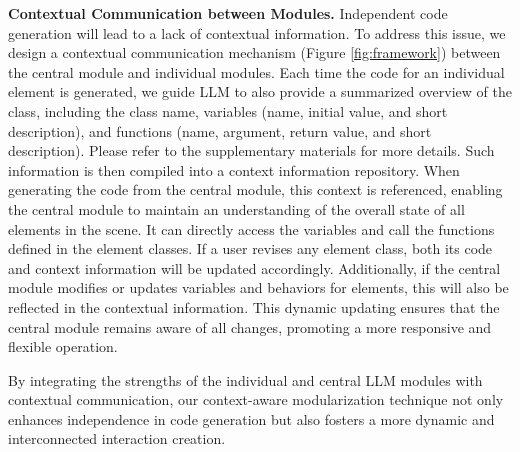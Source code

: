 \textbf{Contextual Communication between Modules.}
Independent code generation will lead to a lack of contextual information. To address this issue, %
we design a contextual communication mechanism  (Figure \ref{fig:framework}) between the central module and individual modules. Each time {the} code for {an} individual element is generated, we guide LLM to also provide a summarized overview of the class, including the class name, variables (name, initial value, and short description), and functions (name, argument, return value, and short description). {Please refer to the supplementary materials for more details.} Such information is then compiled into a context information repository. When generating the code from the central module, this {context} %
is referenced, enabling the central module to maintain an understanding of the overall state of all elements in the scene. It can directly access the variables 
and call the functions defined in the element classes. If a user revises any element {class}, %
both {its} %
code and context information will be updated accordingly. Additionally, if the central module modifies or updates variables and behaviors for elements, this will also be reflected in the contextual information. This dynamic updating ensures that the central module remains aware of all changes, promoting a more responsive and flexible operation.

By integrating the strengths of the individual and central LLM modules with contextual communication, our context-aware modularization technique not only enhances independence in code generation but also fosters a more dynamic and interconnected interaction creation. 






